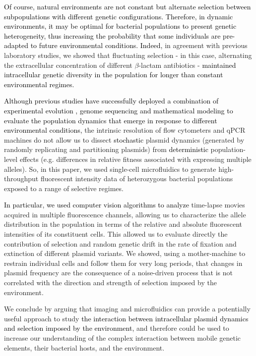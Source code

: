 \documentclass[fleqn,12pt]{wlscirep}
\newcommand{\blue}[1]{\textcolor{black}{#1}}
\begin{document}
\blue{Of course, natural environments are not constant but alternate selection between subpopulations with different genetic configurations. Therefore, in dynamic environments, it may be optimal for bacterial populations to present genetic heterogeneity, thus increasing the probability that some individuals are pre-adapted to future environmental conditions\cite{Ackermann2015}. 
Indeed, }in agreement with previous laboratory studies\cite{Rodriguez2018}, we showed that fluctuating selection  - in this case, alternating the extracellular concentration of different $\beta$-lactam antibiotics - \blue{maintained intracellular genetic diversity in the population for longer than constant environmental regimes. }

\blue{Although previous studies have successfully deployed a combination of experimental evolution \cite{maclean2015,harrison2012,holloway2007}, genome sequencing \cite{Harrison2015,SanMillan2014,porse2016survival} and mathematical modeling \cite{SanMillan2014,Wein2019,santer2019evolutionary,yurtsev2013bacterial,stewart1977population} to evaluate the population dynamics that emerge in response to different environmental conditions,} the intrinsic resolution of flow cytometers and qPCR machines do not allow us to dissect \blue{stochastic} plasmid dynamics (generated by randomly replicating and partitioning plasmids) from \blue{deterministic} population-level effects (e.g. differences in relative fitness associated with expressing multiple alleles).  So, in this paper, we used single-cell microfluidics to generate high-throughput fluorescent intensity data of heterozygous bacterial populations exposed to a range of selective regimes.

\blue{In particular, we used computer vision algorithms to analyze} time-lapse movies acquired in multiple fluorescence channels, allowing us to characterize the allele distribution in the population in terms of the relative and absolute fluorescent intensities of its constituent cells. This allowed us to evaluate directly the contribution of selection and random genetic drift in the rate of fixation and extinction of different plasmid variants.  We showed, using a mother-machine to restrain individual cells and follow them for very long periods, that changes in plasmid frequency are the consequence of a noise-driven process that is not correlated with the direction and strength of selection imposed by the environment.  

We conclude by arguing that imaging and microfluidics can provide a potentially useful approach to study \blue{the interaction between intracellular plasmid dynamics and selection imposed by the environment,} and therefore could be used to increase our understanding of the complex interaction between mobile genetic elements, their bacterial hosts, and the environment.
\end{document}
